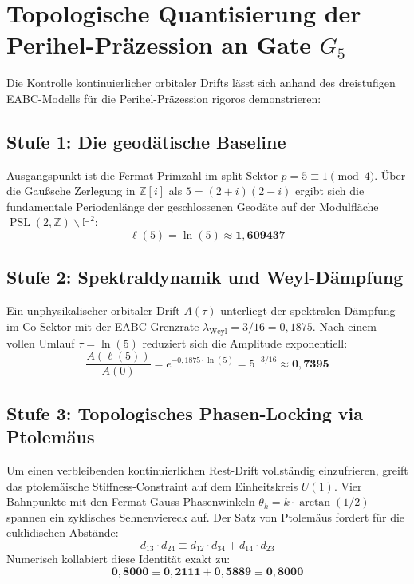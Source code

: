 \documentclass[11pt,a4paper]{article}
\begin{document}
\section{Topologische Quantisierung der Perihel-Präzession an Gate $G_5$}

Die Kontrolle kontinuierlicher orbitaler Drifts lässt sich anhand des dreistufigen EABC-Modells für die Perihel-Präzession rigoros demonstrieren:

\subsection*{Stufe 1: Die geodätische Baseline}
Ausgangspunkt ist die Fermat-Primzahl im split-Sektor $p = 5 \equiv 1 \pmod 4$. Über die Gaußsche Zerlegung in $\mathbb{Z}[i]$ als $5 = (2+i)(2-i)$ ergibt sich die fundamentale Periodenlänge der geschlossenen Geodäte auf der Modulfläche $\operatorname{PSL}(2,\mathbb{Z})\backslash\mathbb{H}^2$:
\begin{equation}
    \ell(5) = \ln(5) \approx \mathbf{1{,}609437}
\end{equation}

\subsection*{Stufe 2: Spektraldynamik und Weyl-Dämpfung}
Ein unphysikalischer orbitaler Drift $A(\tau)$ unterliegt der spektralen Dämpfung im Co-Sektor mit der EABC-Grenzrate $\lambda_{\text{Weyl}} = 3/16 = 0{,}1875$. Nach einem vollen Umlauf $\tau = \ln(5)$ reduziert sich die Amplitude exponentiell:
\begin{equation}
    \frac{A(\ell(5))}{A(0)} = e^{-0{,}1875 \cdot \ln(5)} = 5^{-3/16} \approx \mathbf{0{,}7395}
\end{equation}

\subsection*{Stufe 3: Topologisches Phasen-Locking via Ptolemäus}
Um einen verbleibenden kontinuierlichen Rest-Drift vollständig einzufrieren, greift das ptolemäische Stiffness-Constraint auf dem Einheitskreis $U(1)$. Vier Bahnpunkte mit den Fermat-Gauss-Phasenwinkeln $\theta_k = k \cdot \arctan(1/2)$ spannen ein zyklisches Sehnenviereck auf. Der Satz von Ptolemäus fordert für die euklidischen Abstände:
\begin{equation}
    d_{13} \cdot d_{24} \equiv d_{12} \cdot d_{34} + d_{14} \cdot d_{23}
\end{equation}
Numerisch kollabiert diese Identität exakt zu:
\begin{equation}
    \mathbf{0{,}8000 \equiv 0{,}2111 + 0{,}5889 \equiv 0{,}8000}
\end{equation}
\end{document}
